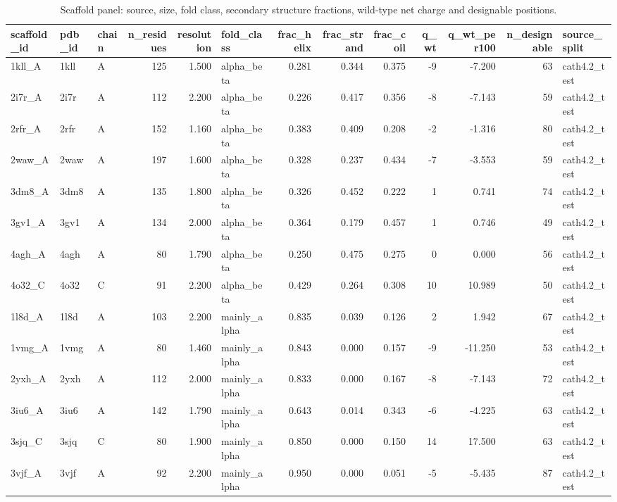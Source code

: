 \begin{table}
\caption{Scaffold panel: source, size, fold class, secondary structure fractions, wild-type net charge and designable positions.}
\label{tab:T1_scaffold_panel}
\begin{tabular}{lllrrlrrrrrrl}
\toprule
scaffold\_id & pdb\_id & chain & n\_residues & resolution & fold\_class & frac\_helix & frac\_strand & frac\_coil & q\_wt & q\_wt\_per100 & n\_designable & source\_split \\
\midrule
1kll\_A & 1kll & A & 125 & 1.500 & alpha\_beta & 0.281 & 0.344 & 0.375 & -9 & -7.200 & 63 & cath4.2\_test \\
2i7r\_A & 2i7r & A & 112 & 2.200 & alpha\_beta & 0.226 & 0.417 & 0.356 & -8 & -7.143 & 59 & cath4.2\_test \\
2rfr\_A & 2rfr & A & 152 & 1.160 & alpha\_beta & 0.383 & 0.409 & 0.208 & -2 & -1.316 & 80 & cath4.2\_test \\
2waw\_A & 2waw & A & 197 & 1.600 & alpha\_beta & 0.328 & 0.237 & 0.434 & -7 & -3.553 & 59 & cath4.2\_test \\
3dm8\_A & 3dm8 & A & 135 & 1.800 & alpha\_beta & 0.326 & 0.452 & 0.222 & 1 & 0.741 & 74 & cath4.2\_test \\
3gv1\_A & 3gv1 & A & 134 & 2.000 & alpha\_beta & 0.364 & 0.179 & 0.457 & 1 & 0.746 & 49 & cath4.2\_test \\
4agh\_A & 4agh & A & 80 & 1.790 & alpha\_beta & 0.250 & 0.475 & 0.275 & 0 & 0.000 & 56 & cath4.2\_test \\
4o32\_C & 4o32 & C & 91 & 2.200 & alpha\_beta & 0.429 & 0.264 & 0.308 & 10 & 10.989 & 50 & cath4.2\_test \\
1l8d\_A & 1l8d & A & 103 & 2.200 & mainly\_alpha & 0.835 & 0.039 & 0.126 & 2 & 1.942 & 67 & cath4.2\_test \\
1vmg\_A & 1vmg & A & 80 & 1.460 & mainly\_alpha & 0.843 & 0.000 & 0.157 & -9 & -11.250 & 53 & cath4.2\_test \\
2yxh\_A & 2yxh & A & 112 & 2.000 & mainly\_alpha & 0.833 & 0.000 & 0.167 & -8 & -7.143 & 72 & cath4.2\_test \\
3iu6\_A & 3iu6 & A & 142 & 1.790 & mainly\_alpha & 0.643 & 0.014 & 0.343 & -6 & -4.225 & 63 & cath4.2\_test \\
3sjq\_C & 3sjq & C & 80 & 1.900 & mainly\_alpha & 0.850 & 0.000 & 0.150 & 14 & 17.500 & 63 & cath4.2\_test \\
3vjf\_A & 3vjf & A & 92 & 2.200 & mainly\_alpha & 0.950 & 0.000 & 0.051 & -5 & -5.435 & 87 & cath4.2\_test \\

\end{tabular}
\end{table}
